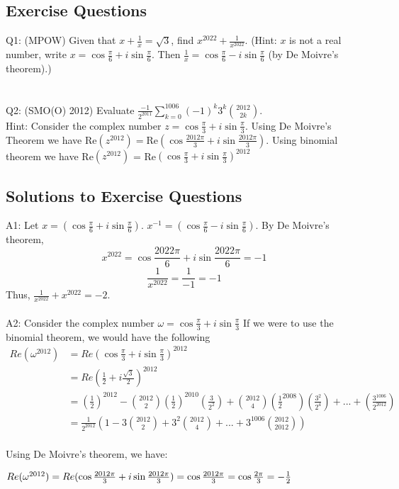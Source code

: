 \documentclass[a4paper,12pt,oneside]{book}
\begin{document}
\subsection{Exercise Questions}
Q1: (MPOW) Given that $x+\frac{1}{x} = \sqrt{3}$, find $x^{2022}+\frac{1}{x^{2022}}$.
(Hint: $x$ is not a real number, write $x = 
\cos\frac{\pi}{6}+i\sin\frac{\pi}{6}$. Then $\frac{1}{x} = \cos\frac{\pi}{6}-i\sin\frac{\pi}{6}$ (by De Moivre's theorem).)\\\\\\
Q2: (SMO(O) 2012)
Evaluate $\frac{-1}{2^{2011}}\sum\limits_{k=0}^{1006}(-1)^k3^k {2012 \choose 2k}$.\\
Hint: Consider the complex number $z = \cos\frac{\pi}{3}+i\sin\frac{\pi}{3}$. Using De Moivre's Theorem we have Re$(z^{2012}) = $Re$(\cos\frac{2012\pi}{3}+i\sin\frac{2012\pi}{3})$. Using binomial theorem we have Re$(z^{2012})$ = Re$(\cos\frac{\pi}{3}+i\sin\frac{\pi}{3})^{2012}$
\newpage
\subsection{Solutions to Exercise Questions}
A1: Let $x = (\cos\frac{\pi}{6}+i\sin\frac{\pi}{6})$. $x^{-1} = (\cos\frac{\pi}{6}-i\sin\frac{\pi}{6})$. By De Moivre's theorem, $$x^{2022} = \cos\frac{2022\pi}{6}+i\sin\frac{2022\pi}{6} = -1$$
$$\frac{1}{x^{2022}} = \frac{1}{-1} = -1$$
Thus, $\frac{1}{x^{2022}} + x^{2022} = -2$.\\\\
A2: Consider the complex number $\omega = \cos\frac{\pi}{3} + i\sin\frac{\pi}{3}
$
If we were to use the binomial theorem, we would have the following
\begin{align*}
Re({\omega^{2012}}) 
&= Re {(\cos\frac{\pi}{3} + i\sin\frac{\pi}{3})^{2012}}\\
&= Re(\frac{1}{2} + i\frac{\sqrt{3}}{2})^{2012}\\
&= (\frac{1}{2})^{2012} - {2012\choose 2}(\frac{1}{2})^{2010}(\frac{3}{2^{2}}) + {2012\choose4}(\frac{1}{2}^{2008})(\frac{3^{2}}{2^{4}})+...+(\frac{3^{1006}}{2^{2012}})\\
&= \frac{1}{2^{2012}} (1 - 3{2012\choose 2} + 3^{2}{2012\choose4}+...+3^{1006}{2012\choose2012})\\
\end{align*}

Using De Moivre's theorem, we have:

$Re({\omega^{2012}}) = Re {(\cos\frac{2012\pi}{3} + i\sin\frac{2012\pi}{3})} = \cos\frac{2012\pi}{3} = \cos\frac{2\pi}{3} = -\frac{1}{2}\\$
\end{document}
